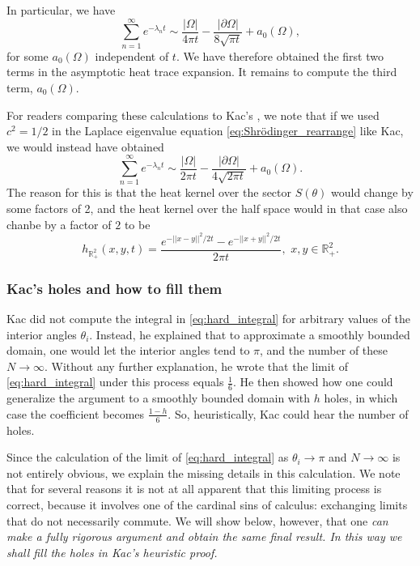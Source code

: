\documentclass{amsart}
\theoremstyle{definition}
\newcommand*{\R}{\mathbb{R}}
\begin{document}
In particular, we have
\begin{equation*}
    \sum_{n = 1}^\infty e^{-\lambda_n t} \sim \frac{|\Omega|}{4\pi t} - \frac{|\partial\Omega|}{8\sqrt{\pi t}} + a_0(\Omega),
\end{equation*}
for some $a_0(\Omega)$ independent of $t$. We have therefore obtained the first two terms in the asymptotic heat trace expansion. It remains to compute the third term, $a_0 (\Omega)$.

For readers comparing these calculations to Kac's \cite{kac1966can}, we note that if we used $c^2 = 1/2$ in the Laplace eigenvalue equation \eqref{eq:Shrödinger_rearrange} like Kac, we would instead have obtained
\begin{equation*}
    \sum_{n = 1}^\infty e^{-\lambda_n t} \sim \frac{|\Omega|}{2\pi t} - \frac{|\partial\Omega|}{4\sqrt{2\pi t}} + a_0(\Omega).
\end{equation*}
The reason for this is that the heat kernel over the sector $S(\theta)$ would change by some factors of 2, %
and the heat kernel over the half space would in that case also chanbe by a factor of $2$ to be 
\begin{equation*}
    h_{\R_+^2}(x,y,t) = \frac{e^{-||x-y||^2/2t} - e^{-||x+y||^2/2t}}{2\pi t}, \,\, x,y \in \R_+^2.
\end{equation*}

\subsubsection{Kac's holes and how to fill them}
\label{sec:microlocal}
Kac did not compute the integral in \eqref{eq:hard_integral} for arbitrary values of the interior angles $\theta_i$.  Instead, he explained that to approximate a smoothly bounded domain, one would let the interior angles tend to $\pi$, and the number of these $N \to \infty$.  Without any further explanation, he wrote that the limit of \eqref{eq:hard_integral} under this process equals $\frac 1 6$.  He then showed how one could generalize the argument to a smoothly bounded domain with $h$ holes, in which case the coefficient becomes $\frac{1-h}{6}$.  So, heuristically, Kac could hear the number of holes.  

Since the calculation of the limit of \eqref{eq:hard_integral} as $\theta_i \to \pi$ and $N \to \infty$ is not entirely obvious, we explain the missing details in this calculation.  We note that for several reasons it is not at all apparent that this limiting process is correct, because it involves one of the cardinal sins of calculus: exchanging limits that do not necessarily commute.  We will show below, however, that one \em can \em make a fully rigorous argument and obtain the same final result.  In this way we shall fill the holes in Kac's heuristic proof.
\end{document}
